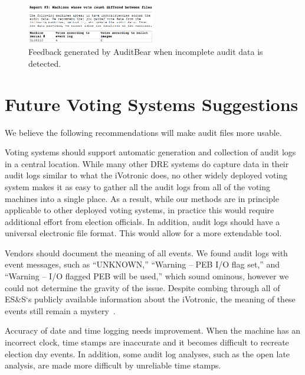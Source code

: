 \documentclass[letterpaper,twocolumn,10pt]{article}
\begin{document}
\begin{figure}[htbp]
\begin{center}
    \includegraphics[width=0.5\textwidth,height=0.2\textheight]{IncompleteAuditData.eps}
\end{center}
\caption{Feedback generated by AuditBear when incomplete audit data is detected.}
\label{fig:incomplete-audit-data}
\end{figure}

\section{Future Voting Systems Suggestions}
\label{sec:suggestions}
We believe the following recommendations will make audit files more usable. 

Voting systems should support automatic generation and collection of audit logs 
in a central location.  While many other DRE systems do capture data in their audit logs similar to what
the iVotronic does, no other widely deployed voting system makes it as easy to
gather all the audit logs from all of the voting machines into a single
place. As a result, while our methods are in principle applicable to other
deployed voting systems, in practice this would require additional effort from
election officials. 
 In addition, audit logs should have a universal 
electronic file format.  This would allow for a more extendable tool.

Vendors should document the meaning of all events. We found audit logs with
event messages, such as ``UNKNOWN,'' ``Warning – PEB I/O flag set,'' and
``Warning – I/O flagged PEB will be used,'' which sound ominous, however we
could not determine the gravity of the issue. Despite combing through all of
ES\&S`s publicly available information about the iVotronic, the meaning of these
events still remain a mystery~\cite{VerVot2011, ESS2011a, ESS2011b}. 
 
Accuracy of date and time logging needs improvement. When the machine has an
incorrect clock, time stamps are inaccurate and it becomes difficult to recreate
election day events. In addition, some audit log analyses, such as the open late
analysis, are made more difficult by unreliable time stamps. 
 
\end{document}
